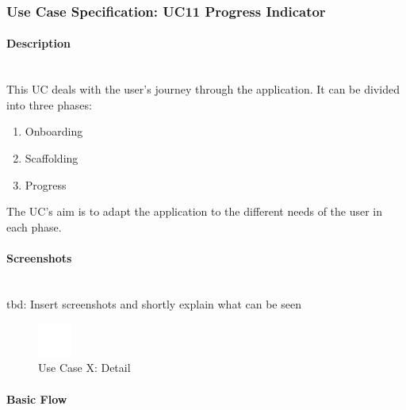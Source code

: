 
\newpage
\subsubsection{Use Case Specification: \ac{UC}11 Progress Indicator}
\label{sec:domainBbl}

\paragraph*{Description}\mbox{}\\
This \ac{UC} deals with the user's journey through the application. 
It can be divided into three phases:
\begin{enumerate}
	\vspace{-3mm}
	\setlength\itemsep{-1em}
	
	\item Onboarding
	\item Scaffolding
	\item Progress
\end{enumerate}
\noindent
The \ac{UC}'s aim is to adapt the application to the different needs of the user in each phase.

\paragraph*{Screenshots}\mbox{}\\
tbd: Insert screenshots and shortly explain what can be seen
\begin{figure}[h] 
	\centering
	\includegraphics[width=0.1\textwidth]{Content/Domain/placeholder.png}
	\caption{Use Case X: Detail}
	\label{fig:label8}
\end{figure}

\paragraph*{Basic Flow} \mbox{}\\

